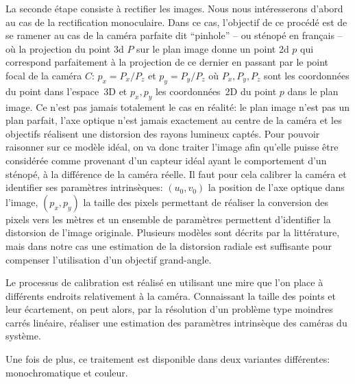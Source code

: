 La seconde étape consiste à rectifier les images. Nous nous
intéresserons d'abord au cas de la rectification
monoculaire. Dans ce cas, l'objectif de ce procédé est de se ramener
au cas de la caméra parfaite dit
``pinhole'' -- ou sténopé en français -- où la projection
du point 3d $P$ sur le plan image donne un point 2d $p$ qui correspond
parfaitement à la projection de ce dernier en passant par le point
focal de la caméra $C$: $p_x = P_x / P_z$ et $p_y = P_y / P_z$ où
$P_x, P_y, P_z$ sont les coordonnées du point dans l'espace 3D et
$p_x, p_y$ les coordonnées 2D du point $p$ dans le plan image. Ce
n'est pas jamais totalement le cas en réalité: le plan image n'est pas
un plan parfait, l'axe optique n'est jamais exactement au centre de la
caméra et les objectifs réalisent une distorsion des
rayons lumineux captés. Pour pouvoir raisonner sur ce modèle idéal, on
va donc traiter l'image afin qu'elle puisse être considérée comme
provenant d'un capteur idéal ayant le comportement d'un sténopé, à la
différence de la caméra réelle. Il faut pour cela calibrer la caméra
et identifier ses paramètres intrinsèques: $(u_0, v_0)$ la position de l'axe optique
dans l'image, $(p_x, p_y)$ la taille des pixels permettant de réaliser
la conversion des pixels vers les mètres et un ensemble de paramètres
permettent d'identifier la distorsion de l'image originale. Plusieurs
modèles sont décrits par la littérature, mais dans notre cas une
estimation de la distorsion radiale est
suffisante pour compenser l'utilisation d'un objectif grand-angle.


Le processus de calibration est
réalisé en utilisant une mire que l'on place à différents endroits
relativement à la caméra. Connaissant la taille des points et leur
écartement, on peut alors, par la résolution d'un problème type
moindres carrés linéaire, réaliser une estimation des paramètres
intrinsèque des caméras du système.

Une fois de plus, ce traitement est disponible dans deux variantes
différentes: monochromatique et couleur.

